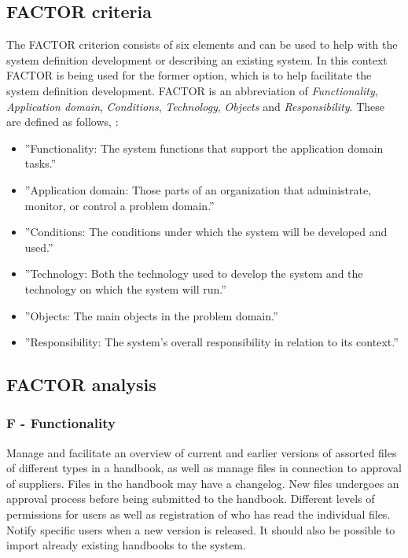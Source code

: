 \subsection{FACTOR criteria} \label{sec:factorcriteria}
The FACTOR criterion consists of six elements and can be used to help with the system definition development or describing an existing system.
In this context FACTOR is being used for the former option, which is to help facilitate the system definition development.
FACTOR is an abbreviation of \textit{Functionality}, \textit{Application domain}, \textit{Conditions}, \textit{Technology}, \textit{Objects} and \textit{Responsibility}.
These are defined as follows, \citep[p.~40]{Rod-Aalborg}:
\begin{itemize}
	\item
		''Functionality:
		The system functions that support the application domain tasks.''
	\item
		''Application domain:
		Those parts of an organization that administrate, monitor, or control a problem domain.''
	\item
		''Conditions:
		The conditions under which the system will be developed and used.''
	\item
		''Technology:
		Both the technology used to develop the system and the technology on which the system will run.''
	\item
		''Objects:
		The main objects in the problem domain.''
	\item
		''Responsibility:
		The system’s overall responsibility in relation to its context.''
\end{itemize}

\subsection{FACTOR analysis}\label{factor}

\subsubsection*{F - Functionality}
Manage and facilitate an overview of current and earlier versions of assorted files of different types in a handbook, as well as manage files in connection to approval of suppliers.
Files in the handbook may have a changelog.
New files undergoes an approval process before being submitted to the handbook.
Different levels of permissions for users as well as registration of who has read the individual files.
Notify specific users when a new version is released.
It should also be possible to import already existing handbooks to the system.

